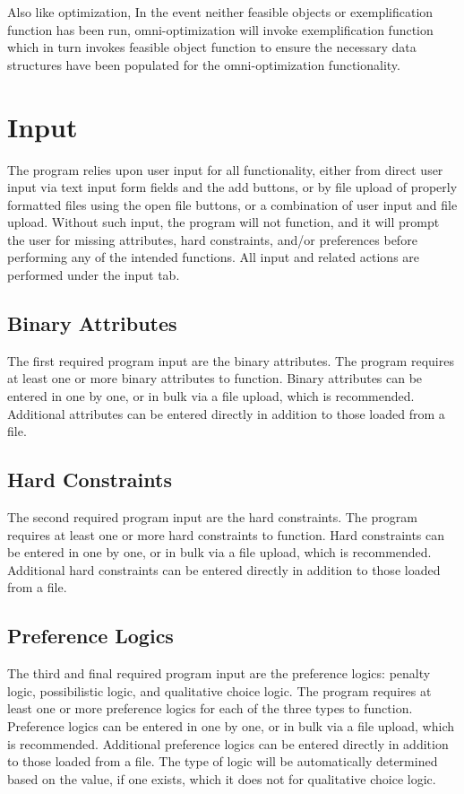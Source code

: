 \documentclass[12pt]{report}
\begin{document}
Also like optimization, In the event neither feasible objects or exemplification function has been run, omni-optimization will invoke exemplification function which in turn invokes feasible object function to ensure the necessary data structures have been populated for the omni-optimization functionality. 

\chapter{Input}
The program relies upon user input for all functionality, either from direct user input via text input form fields and the add buttons, or by file upload of properly formatted files using the open file buttons, or a combination of user input and file upload. Without such input, the program will not function, and it will prompt the user for missing attributes, hard constraints, and/or preferences before performing any of the intended functions. All input and related actions are performed under the input tab.

\section{Binary Attributes}
The first required program input are the binary attributes. The program requires at least one or more binary attributes to function. Binary attributes can be entered in one by one, or in bulk via a file upload, which is recommended. Additional attributes can be entered directly in addition to those loaded from a file.

\section{Hard Constraints}
The second required program input are the hard constraints. The program requires at least one or more hard constraints to function. Hard constraints can be entered in one by one, or in bulk via a file upload, which is recommended. Additional hard constraints can be entered directly in addition to those loaded from a file.

\section{Preference Logics}
The third and final required program input are the preference logics: penalty logic, possibilistic logic, and qualitative choice logic. The program requires at least one or more preference logics for each of the three types to function. Preference logics can be entered in one by one, or in bulk via a file upload, which is recommended. Additional preference logics can be entered directly in addition to those loaded from a file. The type of logic will be automatically determined based on the value, if one exists, which it does not for qualitative choice logic.
\end{document}
